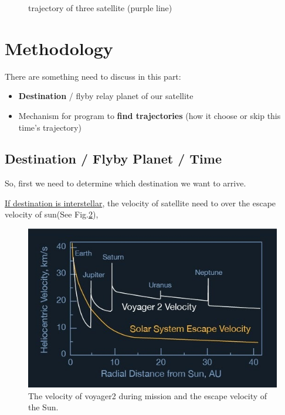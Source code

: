 \documentclass{article}
\begin{document}
\begin{multicols}{2}
\begin{figure}[htbp]
{        \label{fig:tra_u} 
    }
    \caption{trajectory of three satellite (purple line)}
    \label{fig:trajectory}
\end{figure}


\section{Methodology}
There are something need to discuss in this part:
\begin{itemize}
    \item \textbf{Destination} / flyby relay planet of our satellite 
    \item Mechanism for program to \textbf{find trajectories}
    (how it choose or skip this time's trajectory)
\end{itemize}


\subsection{Destination / Flyby Planet / Time}
So, first we need to determine which destination we want to arrive.

\underline{If destination is interstellar}, the velocity of satellite need to over the escape velocity of sun(See Fig.\ref{fig:escape_v}),

\begin{figure}[H]
    \centering 
	\includegraphics[scale=0.37]{v2_escape.jpeg}
	\caption{The velocity of voyager2 during mission and the escape velocity of the Sun.\cite{b3}} %
	\label{fig:escape_v} %
\end{figure}


\end{multicols}
\end{document}
